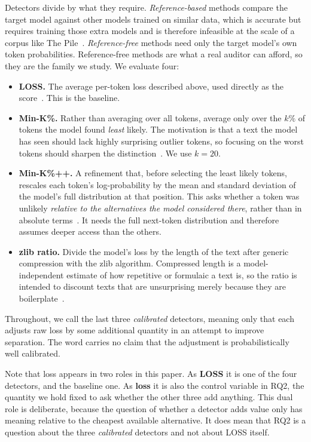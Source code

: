 Detectors divide by what they require. \emph{Reference-based} methods compare the target
model against other models trained on similar data, which is accurate but requires
training those extra models and is therefore infeasible at the scale of a corpus like The
Pile~\citep{carlini2022lira}. \emph{Reference-free} methods need only the target model's
own token probabilities. Reference-free methods are what a real auditor can afford, so
they are the family we study. We evaluate four:

\begin{itemize}
 \item \textbf{LOSS.} The average per-token loss described above, used directly as the
 score~\citep{yeom2018privacy}. This is the baseline.
 \item \textbf{Min-K\%.} Rather than averaging over all tokens, average only over the
 $k\%$ of tokens the model found \emph{least} likely. The motivation is that a text the
 model has seen should lack highly surprising outlier tokens, so focusing on the worst
 tokens should sharpen the distinction~\citep{shi2024detecting}. We use $k=20$.
 \item \textbf{Min-K\%++.} A refinement that, before selecting the least likely tokens,
 rescales each token's log-probability by the mean and standard deviation of the
 model's full distribution at that position. This asks whether a token was unlikely
 \emph{relative to the alternatives the model considered there}, rather than in absolute
 terms~\citep{zhang2025minkpp}. It needs the full next-token distribution and therefore
 assumes deeper access than the others.
 \item \textbf{zlib ratio.} Divide the model's loss by the length of the text after
 generic compression with the zlib algorithm. Compressed length is a model-independent
 estimate of how repetitive or formulaic a text is, so the ratio is intended to discount
 texts that are unsurprising merely because they are boilerplate~\citep{carlini2021extracting}.
\end{itemize}

Throughout, we call the last three \emph{calibrated} detectors, meaning only that each
adjusts raw loss by some additional quantity in an attempt to improve separation. The
word carries no claim that the adjustment is probabilistically well calibrated.

Note that loss appears in two roles in this paper. As \textbf{LOSS} it is one of the four
detectors, and the baseline one. As \textbf{loss} it is also the control variable in RQ2,
the quantity we hold fixed to ask whether the other three add anything. This dual role is
deliberate, because the question of whether a detector adds value only has meaning
relative to the cheapest available alternative. It does mean that RQ2 is a question about
the three \emph{calibrated} detectors and not about LOSS itself.

